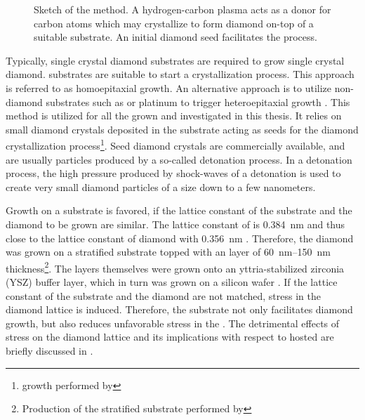 	\begin{figure}[!htp]
		\centering
		\caption[\CVD production method]{Sketch of the \CVD method. A hydrogen-carbon plasma acts as a donor for carbon atoms which may crystallize to form diamond on-top of a suitable \ir substrate. An initial diamond seed facilitates the process.}
		\label{fig::cvd_sketch}
	\end{figure}

	Typically, single crystal diamond substrates are required to grow single crystal diamond. \HPHT substrates are suitable to start a crystallization process. This approach is referred to as homoepitaxial growth. An alternative approach is to utilize non-diamond substrates such as \ir or platinum to trigger heteroepitaxial growth \cite{tachibana2001growth, lin1994local}.
	This method is utilized for all the \CVD \nds grown and investigated in this thesis.
	It relies on small diamond crystals deposited in the substrate acting as seeds for the diamond crystallization process\footnote{\CVD \nd growth performed by \gsell}. Seed diamond crystals are commercially available, and are usually particles produced by a so-called detonation process.
	In a detonation process, the high pressure produced by shock-waves of a detonation is used to create very small diamond particles of a size down to a few nanometers.
	
	Growth on a substrate is favored, if the lattice constant of the substrate and the diamond to be grown are similar.
	The lattice constant of \ir is \SI{0.384}{nm} \cite{Arblaster2010,Gsell2007} and thus close to the lattice constant of diamond with \SI{0.356}{nm} \cite{davis1993diamond}.
	Therefore, the diamond was grown on a stratified substrate topped with an \ir layer of \SIrange{60}{150}{nm} thickness\footnote{Production of the stratified substrate performed by \gsell}.
	The \ir layers themselves were grown onto an yttria-stabilized zirconia (YSZ) buffer layer, which in turn was grown on a silicon wafer \cite{Gsell2004a}.
	If the lattice constant of the substrate and the diamond are not matched, stress in the diamond lattice is induced.
	Therefore, the \ir substrate not only facilitates diamond growth, but also reduces unfavorable stress in the \nds. The detrimental effects of stress on the diamond lattice and its implications with respect to hosted \sivs are briefly discussed in .

